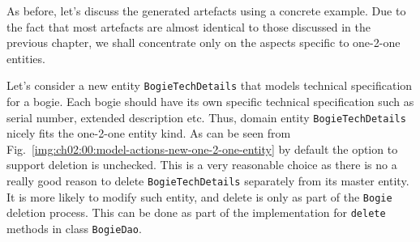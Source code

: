   As before, let's discuss the generated artefacts using a concrete example.
  Due to the fact that most artefacts are almost identical to those discussed in the previous chapter, we shall concentrate only on the aspects specific to one-2-one entities.
  
  Let's consider a new entity \texttt{BogieTechDetails} that models technical specification for a bogie.
  Each bogie should have its own specific technical specification such as serial number, extended description etc.
  Thus, domain entity \texttt{BogieTechDetails} nicely fits the one-2-one entity kind.
  As can be seen from Fig.~\ref{img:ch02:00:model-actions-new-one-2-one-entity} by default the option to support deletion is unchecked.
  This is a very reasonable choice as there is no a really good reason to delete \texttt{BogieTechDetails} separately from its master entity.
  It is more likely to modify such entity, and delete is only as part of the \texttt{Bogie} deletion process.
  This can be done as part of the implementation for \texttt{delete} methods in class \texttt{BogieDao}.
  
